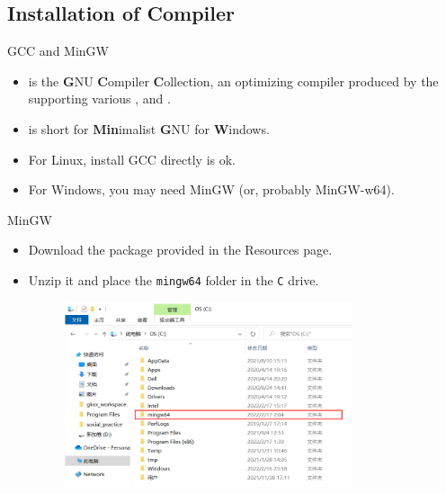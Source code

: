 \documentclass[handout]{beamer}
\begin{document}
\subsection{Installation of Compiler}

\begin{frame}{GCC and MinGW}
    \begin{itemize}
        \item {} is the \textbf{G}NU \textbf{C}ompiler \textbf{C}ollection, an optimizing compiler produced by the  supporting various ,  and .
        \item {} is short for \textbf{Min}imalist \textbf{G}NU for \textbf{W}indows.
        \pause
        \item For Linux, install GCC directly is ok.
        \item For Windows, you may need MinGW (or, probably MinGW-w64).
    \end{itemize}
\end{frame}

\begin{frame}{MinGW}
    \begin{itemize}
        \item Download the package provided in the Resources page.
        \item Unzip it and place the \texttt{mingw64} folder in the \texttt{C} drive.
        \begin{figure}[h]
            \centering
            \includegraphics[width=0.8\textwidth]{figures/mingw_in_c.png}
        \end{figure}
    \end{itemize}
\end{frame}
\end{document}
